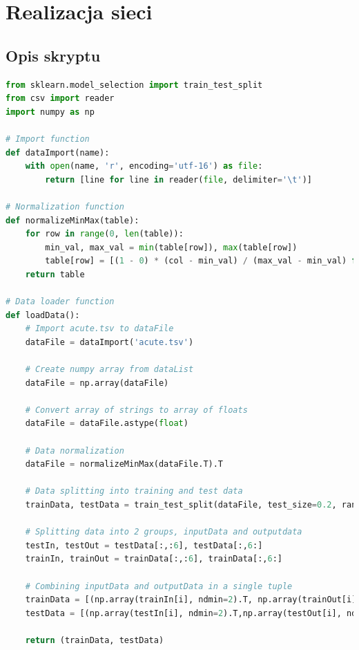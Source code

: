 \documentclass[12pt,twoside]{article}
\begin{document}
\clearpage

\section{Realizacja sieci}

\subsection{Opis skryptu}

\begin{lstlisting}[caption={Plik przygotowujący dane- data.py},label={Lst:data_py},language=Python,basicstyle=\scriptsize]
from sklearn.model_selection import train_test_split
from csv import reader
import numpy as np

# Import function
def dataImport(name):
    with open(name, 'r', encoding='utf-16') as file:
        return [line for line in reader(file, delimiter='\t')]

# Normalization function
def normalizeMinMax(table):
    for row in range(0, len(table)):
        min_val, max_val = min(table[row]), max(table[row])
        table[row] = [(1 - 0) * (col - min_val) / (max_val - min_val) for col in table[row]]
    return table

# Data loader function
def loadData():
    # Import acute.tsv to dataFile
    dataFile = dataImport('acute.tsv')

    # Create numpy array from dataList
    dataFile = np.array(dataFile)

    # Convert array of strings to array of floats
    dataFile = dataFile.astype(float)

    # Data normalization
    dataFile = normalizeMinMax(dataFile.T).T

    # Data splitting into training and test data
    trainData, testData = train_test_split(dataFile, test_size=0.2, random_state=25)

    # Splitting data into 2 groups, inputData and outputdata
    testIn, testOut = testData[:,:6], testData[:,6:]
    trainIn, trainOut = trainData[:,:6], trainData[:,6:]

    # Combining inputData and outputData in a single tuple
    trainData = [(np.array(trainIn[i], ndmin=2).T, np.array(trainOut[i], ndmin=2).T) for i in range(0, len(trainOut))]
    testData = [(np.array(testIn[i], ndmin=2).T,np.array(testOut[i], ndmin=2).T) for i in range(0, len(testOut))]

    return (trainData, testData)
\end{lstlisting}
\end{document}
